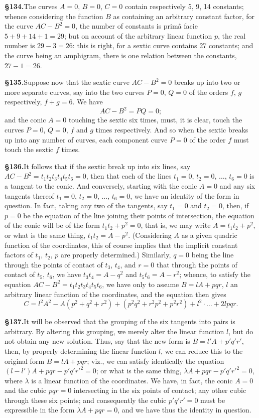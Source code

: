 \documentclass[11pt,a4paper]{article}
\begin{document}
\textbf{\S 134.}\quad The curves $A = 0$, $B = 0$, $C = 0$ contain respectively 5, 9, 14 constants; whence considering the function $B$ as containing an arbitrary constant factor, for the curve $AC - B^2 = 0$, the number of constants is prim\^a facie $5 + 9 + 14 + 1 = 29$; but on account of the arbitrary linear function $p$, the real number is $29 - 3 = 26$: this is right, for a sextic curve contains 27 constants; and the curve being an amphigram, there is one relation between the constants, $27 - 1 = 26$.

\textbf{\S 135.}\quad Suppose now that the sextic curve $AC - B^2 = 0$ breaks up into two or more separate curves, say into the two curves $P = 0$, $Q = 0$ of the orders $f$, $g$ respectively, $f + g = 6$. We have
\[
AC - B^2 = PQ = 0;
\]
and the conic $A = 0$ touching the sextic six times, must, it is clear, touch the curves $P = 0$, $Q = 0$, $f$ and $g$ times respectively. And so when the sextic breaks up into any number of curves, each component curve $P = 0$ of the order $f$ must touch the sextic $f$ times.

\textbf{\S 136.}\quad It follows that if the sextic break up into six lines, say $AC - B^2 = t_1t_2t_3t_4t_5t_6 = 0$, then that each of the lines $t_1 = 0$, $t_2 = 0$, $\ldots$, $t_6 = 0$ is a tangent to the conic. And conversely, starting with the conic $A = 0$ and any six tangents thereof $t_1 = 0$, $t_2 = 0$, $\ldots$, $t_6 = 0$, we have an identity of the form in question. In fact, taking any two of the tangents, say $t_1 = 0$ and $t_2 = 0$, then, if $p = 0$ be the equation of the line joining their points of intersection, the equation of the conic will be of the form $t_1t_2 + p^2 = 0$, that is, we may write $A = t_1t_2 + p^2$, or what is the same thing, $t_1t_2 = A - p^2$. (Considering $A$ as a given quadric function of the coordinates, this of course implies that the implicit constant factors of $t_1$, $t_2$, $p$ are properly determined.) Similarly, $q = 0$ being the line through the points of contact of $t_3$, $t_4$, and $r = 0$ that through the points of contact of $t_5$, $t_6$, we have $t_3t_4 = A - q^2$ and $t_5t_6 = A - r^2$; whence, to satisfy the equation $AC - B^2 = t_1t_2t_3t_4t_5t_6$, we have only to assume $B = lA + pqr$, $l$ an arbitrary linear function of the coordinates, and the equation then gives
\[
C = l^2A^2 - A(p^2 + q^2 + r^2) + (p^2q^2 + r^2p^2 + p^2r^2) + l^2 \cdot \ldots + 2lpqr.
\]

\textbf{\S 137.}\quad It will be observed that the grouping of the six tangents into pairs is arbitrary. By altering this grouping, we merely alter the linear function $l$, but do not obtain any new solution. Thus, say that the new form is $B = l'A + p'q'r'$, then, by properly determining the linear function $l$, we can reduce this to the original form $B = lA + pqr$; viz., we can satisfy identically the equation $(l - l')A + pqr - p'q'r'^2 = 0$; or what is the same thing, $\lambda A + pqr - p'q'r'^2 = 0$, where $\lambda$ is a linear function of the coordinates. We have, in fact, the conic $A = 0$ and the cubic $pqr = 0$ intersecting in the six points of contact; any other cubic through these six points; and consequently the cubic $p'q'r' = 0$ must be expressible in the form $\lambda A + pqr = 0$, and we have thus the identity in question.
\end{document}
